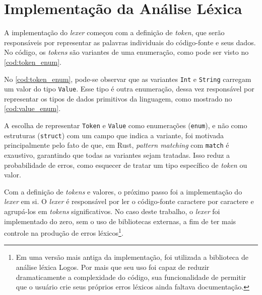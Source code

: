 \section{Implementação da Análise Léxica}

A implementação do \textit{lexer} começou com a definição de \textit{token}, que serão responsáveis por representar as palavras individuais do código-fonte e seus dados. No código, os \textit{tokens} são variantes de uma enumeração, como pode ser visto no \autoref{cod:token_enum}.

\codigoRust

\vspace{-1em}

No \autoref{cod:token_enum}, pode-se observar que as variantes \texttt{Int} e \texttt{String} carregam um valor do tipo \texttt{Value}. Esse tipo é outra enumeração, dessa vez responsável por representar os tipos de dados primitivos da linguagem, como mostrado no \autoref{cod:value_enum}.

\codigoRust

\vspace{-1em}

A escolha de representar \texttt{Token} e \texttt{Value} como enumerações (\texttt{enum}), e não como estruturas (\texttt{struct}) com um campo que indica a variante, foi motivada principalmente pelo fato de que, em Rust, \textit{pattern matching} com \texttt{match} é exaustivo, garantindo que todas as variantes sejam tratadas. Isso reduz a probabilidade de erros, como esquecer de tratar um tipo específico de \textit{token} ou valor.

Com a definição de \textit{tokens} e valores, o próximo passo foi a implementação do \textit{lexer} em si. O \textit{lexer} é responsável por ler o código-fonte caractere por caractere e agrupá-los em \textit{tokens} significativos. No caso deste trabalho, o \textit{lexer} foi implementado do zero, sem o uso de bibliotecas externas, a fim de ter mais controle na produção de erros léxicos\footnote{Em uma versão mais antiga da implementação, foi utilizada a biblioteca de análise léxica Logos. Por mais que seu uso foi capaz de reduzir dramaticamente a complexidade do código, sua funcionalidade de permitir que o usuário crie seus próprios erros léxicos ainda faltava documentação.}.

